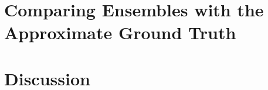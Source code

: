 \documentclass[11pt, A4, twoside, openright]{report}
\begin{document}
\chapter{Comparing Ensembles with the Approximate Ground Truth}
% 







\chapter{Discussion}






% 

\printbibliography


\begin{appendices}

\end{appendices}
\end{document}
